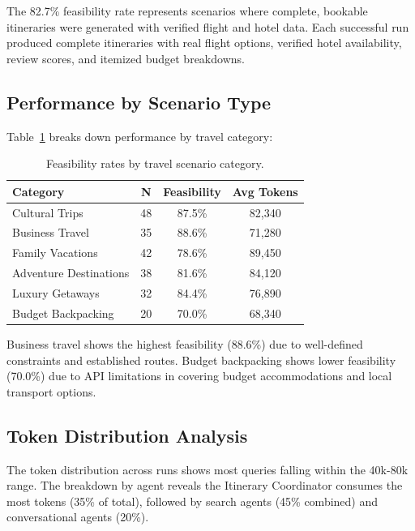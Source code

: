 \documentclass[preprint,review,12pt]{elsarticle}
\begin{document}
The 82.7\% feasibility rate represents scenarios where complete, bookable itineraries were generated with verified flight and hotel data. Each successful run produced complete itineraries with real flight options, verified hotel availability, review scores, and itemized budget breakdowns.

\subsection{Performance by Scenario Type}

Table~\ref{tab:scenario_performance} breaks down performance by travel category:

\begin{table}[h]
\centering
\caption{Feasibility rates by travel scenario category.}
\label{tab:scenario_performance}
\begin{tabular}{lccc}
\toprule
\textbf{Category} & \textbf{N} & \textbf{Feasibility} & \textbf{Avg Tokens} \\
\midrule
Cultural Trips & 48 & 87.5\% & 82,340 \\
Business Travel & 35 & 88.6\% & 71,280 \\
Family Vacations & 42 & 78.6\% & 89,450 \\
Adventure Destinations & 38 & 81.6\% & 84,120 \\
Luxury Getaways & 32 & 84.4\% & 76,890 \\
Budget Backpacking & 20 & 70.0\% & 68,340 \\
\bottomrule
\end{tabular}
\end{table}

Business travel shows the highest feasibility (88.6\%) due to well-defined constraints and established routes. Budget backpacking shows lower feasibility (70.0\%) due to API limitations in covering budget accommodations and local transport options.

\subsection{Token Distribution Analysis}

The token distribution across runs shows most queries falling within the 40k-80k range. The breakdown by agent reveals the Itinerary Coordinator consumes the most tokens (35\% of total), followed by search agents (45\% combined) and conversational agents (20\%).
\end{document}
